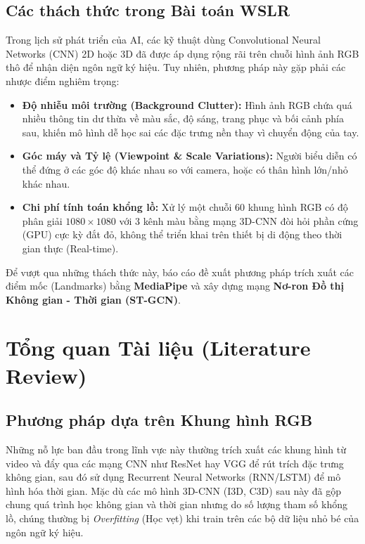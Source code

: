 \documentclass[a4paper,12pt]{report}
\begin{document}
\section{Các thách thức trong Bài toán WSLR}
Trong lịch sử phát triển của AI, các kỹ thuật dùng Convolutional Neural Networks (CNN) 2D hoặc 3D đã được áp dụng rộng rãi trên chuỗi hình ảnh RGB thô để nhận diện ngôn ngữ ký hiệu. Tuy nhiên, phương pháp này gặp phải các nhược điểm nghiêm trọng:
\begin{itemize}
    \item \textbf{Độ nhiễu môi trường (Background Clutter):} Hình ảnh RGB chứa quá nhiều thông tin dư thừa về màu sắc, độ sáng, trang phục và bối cảnh phía sau, khiến mô hình dễ học sai các đặc trưng nền thay vì chuyển động của tay.
    \item \textbf{Góc máy và Tỷ lệ (Viewpoint \& Scale Variations):} Người biểu diễn có thể đứng ở các góc độ khác nhau so với camera, hoặc có thân hình lớn/nhỏ khác nhau.
    \item \textbf{Chi phí tính toán khổng lồ:} Xử lý một chuỗi 60 khung hình RGB có độ phân giải $1080 \times 1080$ với 3 kênh màu bằng mạng 3D-CNN đòi hỏi phần cứng (GPU) cực kỳ đắt đỏ, không thể triển khai trên thiết bị di động theo thời gian thực (Real-time).
\end{itemize}

Để vượt qua những thách thức này, báo cáo đề xuất phương pháp trích xuất các điểm mốc (Landmarks) bằng \textbf{MediaPipe} và xây dựng mạng \textbf{Nơ-ron Đồ thị Không gian - Thời gian (ST-GCN)}. 

\chapter{Tổng quan Tài liệu (Literature Review)}

\section{Phương pháp dựa trên Khung hình RGB}
Những nỗ lực ban đầu trong lĩnh vực này thường trích xuất các khung hình từ video và đẩy qua các mạng CNN như ResNet hay VGG để rút trích đặc trưng không gian, sau đó sử dụng Recurrent Neural Networks (RNN/LSTM) để mô hình hóa thời gian. Mặc dù các mô hình 3D-CNN (I3D, C3D) sau này đã gộp chung quá trình học không gian và thời gian nhưng do số lượng tham số khổng lồ, chúng thường bị \textit{Overfitting} (Học vẹt) khi train trên các bộ dữ liệu nhỏ bé của ngôn ngữ ký hiệu.
\end{document}
